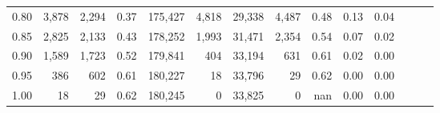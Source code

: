 \begin{tabular}{rrrrrrrrrrrrrr}
0.80 &   3,878 &  2,294 &  0.37 &  175,427 &    4,818 &  29,338 &   4,487 &  0.48 &  0.13 &      0.04 \\
0.85 &   2,825 &  2,133 &  0.43 &  178,252 &    1,993 &  31,471 &   2,354 &  0.54 &  0.07 &      0.02 \\
0.90 &   1,589 &  1,723 &  0.52 &  179,841 &      404 &  33,194 &     631 &  0.61 &  0.02 &      0.00 \\
0.95 &     386 &    602 &  0.61 &  180,227 &       18 &  33,796 &      29 &  0.62 &  0.00 &      0.00 \\
1.00 &      18 &     29 &  0.62 &  180,245 &        0 &  33,825 &       0 &   nan &  0.00 &      0.00 \\
\bottomrule
\end{tabular}
